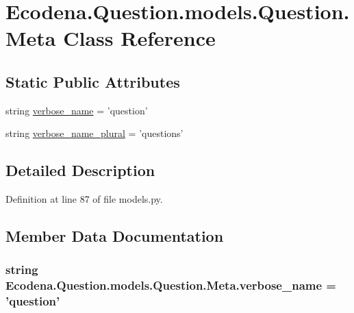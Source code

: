 \hypertarget{class_ecodena_1_1_question_1_1models_1_1_question_1_1_meta}{
\section{Ecodena.Question.models.Question.Meta Class Reference}
\label{d6/da7/class_ecodena_1_1_question_1_1models_1_1_question_1_1_meta}
}
\subsection*{Static Public Attributes}
\begin{DoxyCompactItemize}
\item 
string \hyperlink{class_ecodena_1_1_question_1_1models_1_1_question_1_1_meta_a1079a83cc552335694f5bc135284b7fd}{verbose\_\-name} = 'question'
\item 
string \hyperlink{class_ecodena_1_1_question_1_1models_1_1_question_1_1_meta_aa9d8ba6465bbcd410a41f58cb33daaa8}{verbose\_\-name\_\-plural} = 'questions'
\end{DoxyCompactItemize}


\subsection{Detailed Description}


Definition at line 87 of file models.py.



\subsection{Member Data Documentation}
\hypertarget{class_ecodena_1_1_question_1_1models_1_1_question_1_1_meta_a1079a83cc552335694f5bc135284b7fd}{
\subsubsection[{verbose\_\-name}]{\setlength{\rightskip}{0pt plus 5cm}string {\bf Ecodena.Question.models.Question.Meta.verbose\_\-name} = 'question'}}
\label{d6/da7/class_ecodena_1_1_question_1_1models_1_1_question_1_1_meta_a1079a83cc552335694f5bc135284b7fd}



